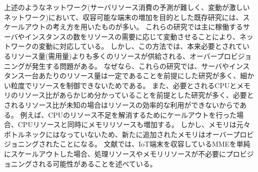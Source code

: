 \documentclass[a4j]{ujarticle}
\begin{document}
上述のようなネットワーク(サーバリソース消費の予測が難しく、変動が激しいネットワーク)において、収容可能な端末の増加を目的とした既存研究には、スケールアウトの考え方を用いたものが多い。
これらの研究では主に稼働するサーバやインスタンスの数をリソースの需要に応じて変動させることにより、ネットワークの変動に対応している\cite{Scale-OutArchitectureforServiceOrderProcessingSystems}。
しかし、この方法では、本来必要とされているリソース量(需用量)よりも多くのリソースが供給される、オーバープロビジョニングが発生する問題がある。
なぜなら、これらの研究では、サーバやインスタンス一台あたりのリソース量は一定であることを前提にした研究が多く、細かい粒度でリソースを制御できないためである。
また、必要とされるCPUとメモリのリソース比があらかじめ分かっていることを前提とした研究が多く、必要とされるリソース比が未知の場合はリソースの効率的な利用ができないからである。
例えば、CPUのリソース不足を解消するためにケールアウトを行った場合、CPUリソースと同時にメモリリソースも増加する。
しかし、メモリは元々ボトルネックにはなっていないため、新たに追加されたメモリはオーバープロビジョニングされたことになる。
文献\cite{ACloudNativeSolutionforDynamicAutoScalingofMMEinLTE}では、IoT端末を収容しているMMEを単純にスケールアウトした場合、処理リソースやメモリリソースが不必要にプロビジョニングされる可能性があることを述べている。
\end{document}
